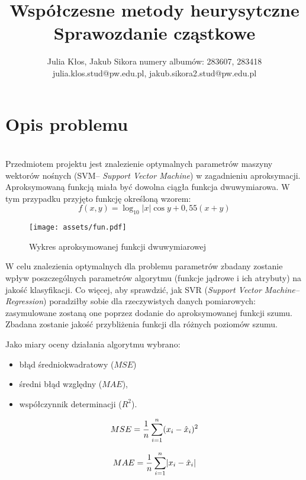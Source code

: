\documentclass{article}
\title{Współczesne metody heurysytczne\\ Sprawozdanie cząstkowe}
\author{
Julia Kłos, Jakub Sikora
\affiliations
numery albumów: 283607, 283418 \\
\emails
julia.klos.stud@pw.edu.pl, jakub.sikora2.stud@pw.edu.pl
}
\begin{document}
\maketitle

\section{Opis problemu}
\label{sec:problem}
\\
Przedmiotem projektu jest znalezienie optymalnych parametrów maszyny wektorów nośnych (SVM-- \textit{Support Vector Machine}) w zagadnieniu aproksymacji. Aproksymowaną funkcją miała być dowolna ciągła funkcja dwuwymiarowa. W tym przypadku przyjęto funkcję określoną wzorem:
\begin{equation}
    \label{eqn:fun}
    f(x,y) = \log_{10}{|x|} \cos{y} + 0,55(x+y)
\end{equation}
\smallskip
\begin{figure}[h]
    \centering
    \texttt{[image: assets/fun.pdf]}
    \caption{Wykres aproksymowanej funkcji dwuwymiarowej}
    \label{fig:fun}
\end{figure}
W celu znalezienia optymalnych dla problemu parametrów zbadany zostanie wpływ poszczególnych parametrów algorytmu (funkcje jądrowe i ich atrybuty) na jakość klasyfikacji. Co więcej, aby sprawdzić, jak SVR (\textit{Support Vector Machine-- Regression}) poradziłby sobie dla rzeczywistych danych pomiarowych: zasymulowane zostaną one poprzez dodanie do aproksymowanej funkcji szumu. Zbadana zostanie jakość przybliżenia funkcji dla różnych poziomów szumu. 

Jako miary oceny działania algorytmu wybrano:
\begin{itemize}
    \item błąd średniokwadratowy ($MSE$)
    \item średni błąd względny ($MAE$),
    \item współczynnik determinacji ($R^2$).
\end{itemize}

        \begin{equation}
            \label{eqn:mse}
            MSE =\frac{1}{n} \sum_{i=1}^n (x_{i}-\hat{x}_{i})^2 \\[2ex]
        \end{equation}
        
        \begin{equation}
            \label{eqn:mae}
            MAE =\frac{1}{n} \sum_{i=1}^n \lvert x_{i}-\hat{x}_{i} \rvert \\[2ex]
        \end{equation}
        
\end{document}
